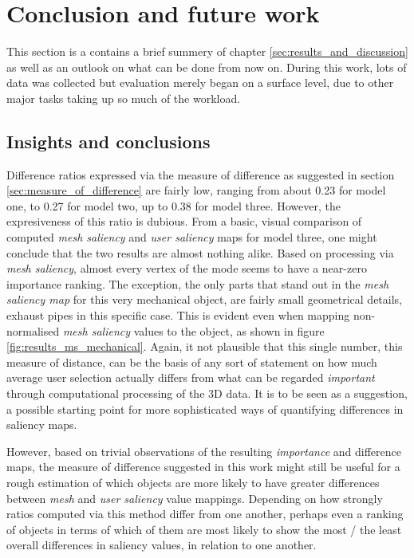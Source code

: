 \chapter{Conclusion and future work}
\label{sec:conclusion_and_future_work}
This section is a contains a brief summery of chapter \ref{sec:results_and_discussion} as well as an outlook on what can be done from now on. During this work, lots of data was collected but evaluation merely began on a surface level, due to other major tasks taking up so much of the workload.

\section{Insights and conclusions}
\label{insights_and_conclusions}

Difference ratios expressed via the measure of difference as suggested in section \ref{sec:measure_of_difference} are fairly low, ranging from about 0.23 for model one, to 0.27 for model two, up to 0.38 for model three. However, the expresiveness of this ratio is dubious. From a basic, visual comparison of computed \textit{mesh saliency} and \textit{user saliency} maps for model three, one might conclude that the two results are almost nothing alike. Based on processing via \textit{mesh saliency}, almost every vertex of the mode seems to have a near-zero importance ranking. The exception, the only parts that stand out in the \textit{mesh saliency map} for this very mechanical object, are fairly small geometrical details, exhaust pipes in this specific case. This is evident even when mapping non-normalised \textit{mesh saliency} values to the object, as shown in figure \ref{fig:results_ms_mechanical}. Again, it not plausible that this single number, this measure of distance, can be the basis of any sort of statement on how much average user selection actually differs from what can be regarded \textit{important} through computational processing of the 3D data. It is to be seen as a suggestion, a possible starting point for more sophisticated ways of quantifying differences in saliency maps.

However, based on trivial observations of the resulting \textit{importance} and difference maps, the measure of difference suggested in this work might still be useful for a rough estimation of which objects are more likely to have greater differences between \textit{mesh} and \textit{user saliency} value mappings. Depending on how strongly ratios computed via this method differ from one another, perhaps even a ranking of objects in terms of which of them are most likely to show the most / the least overall differences in saliency values, in relation to one another.

